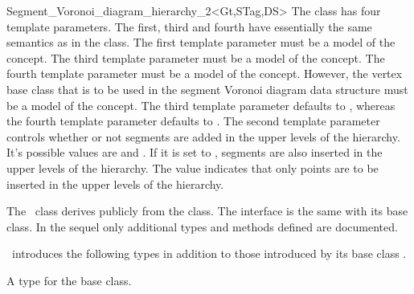 \begin{ccRefClass}{Segment_Voronoi_diagram_hierarchy_2<Gt,STag,DS>}
The class has four template parameters. The first, third and fourth
have essentially the same semantics as in the
 class. The
first template parameter must be a model of the
 concept.
The third template parameter must be a model of the
 concept. The fourth template parameter must be a
model of the 
concept. However, the vertex base class that is to be used in the
segment Voronoi diagram data structure must
be a model of the 
concept. The third template parameter defaults to
, whereas the fourth template parameter defaults to
. The second template
parameter controls whether or not segments are added in the upper
levels of the hierarchy. It's possible values are 
and . If it is set to ,
segments are also inserted in the upper levels of the hierarchy. The
value  indicates that only points are to be
inserted in the upper levels of the hierarchy.


The \ccRefName\ class derives publicly from the
 class. The interface is
the same with its base class. In the sequel only additional types
and methods defined are documented.





\ccInheritsFrom
{}


\ccTypes
\ccRefName\ introduces the following types in addition to those
introduced by its base class
.

\ccThreeToTwo
{}
\ccGlue
{}
	  {A type for the base class.}


\end{ccRefClass}
